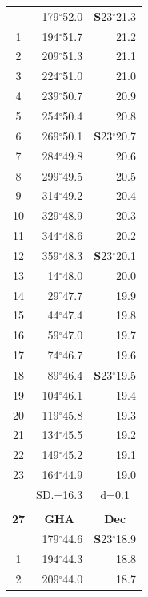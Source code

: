 \documentclass[10pt, a4paper]{report}
\begin{document}
\begin{scriptsize}
\begin{tabular*}{0.2\textwidth}[t]{@{\extracolsep{\fill}}|c|rr|}
\hline\rule{0pt}{2.6ex}\noindent
0 & 179$^\circ$52.0 & \textbf{S}23$^\circ$21.3\\
1 & 194$^\circ$51.7 & 21.2\\
2 & 209$^\circ$51.3 & 21.1\\
3 & 224$^\circ$51.0 & \raisebox{0.24ex}{\boldmath$\cdot$~\boldmath$\cdot$~~}21.0\\
4 & 239$^\circ$50.7 & 20.9\\
5 & 254$^\circ$50.4 & 20.8\\[2Pt]
6 & 269$^\circ$50.1 & \textbf{S}23$^\circ$20.7\\
7 & 284$^\circ$49.8 & 20.6\\
8 & 299$^\circ$49.5 & 20.5\\
9 & 314$^\circ$49.2 & \raisebox{0.24ex}{\boldmath$\cdot$~\boldmath$\cdot$~~}20.4\\
10 & 329$^\circ$48.9 & 20.3\\
11 & 344$^\circ$48.6 & 20.2\\[2Pt]
12 & 359$^\circ$48.3 & \textbf{S}23$^\circ$20.1\\
13 & 14$^\circ$48.0 & 20.0\\
14 & 29$^\circ$47.7 & 19.9\\
15 & 44$^\circ$47.4 & \raisebox{0.24ex}{\boldmath$\cdot$~\boldmath$\cdot$~~}19.8\\
16 & 59$^\circ$47.0 & 19.7\\
17 & 74$^\circ$46.7 & 19.6\\[2Pt]
18 & 89$^\circ$46.4 & \textbf{S}23$^\circ$19.5\\
19 & 104$^\circ$46.1 & 19.4\\
20 & 119$^\circ$45.8 & 19.3\\
21 & 134$^\circ$45.5 & \raisebox{0.24ex}{\boldmath$\cdot$~\boldmath$\cdot$~~}19.2\\
22 & 149$^\circ$45.2 & 19.1\\
23 & 164$^\circ$44.9 & 19.0\\
\hline
\rule{0pt}{2.4ex} & \multicolumn{1}{c}{SD.=16.3} & \multicolumn{1}{c|}{d=0.1}\\
\hline
\multicolumn{1}{c}{}\\[-0.5ex]\hline
\multicolumn{1}{|c|}{\rule{0pt}{2.6ex}\textbf{27}} & \multicolumn{1}{c}{\textbf{GHA}} & \multicolumn{1}{c|}{\textbf{Dec}}\\
\hline\rule{0pt}{2.6ex}\noindent
0 & 179$^\circ$44.6 & \textbf{S}23$^\circ$18.9\\
1 & 194$^\circ$44.3 & 18.8\\
2 & 209$^\circ$44.0 & 18.7\\

\end{tabular*}
\end{scriptsize}
\end{document}
